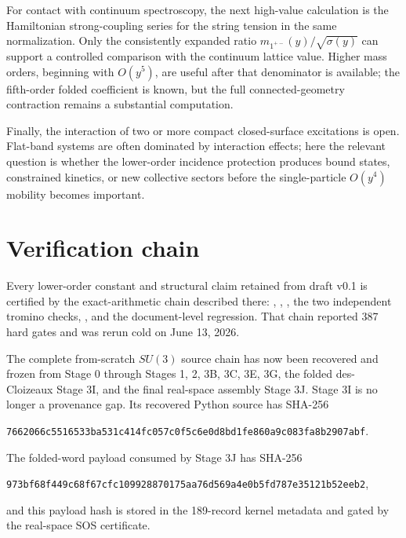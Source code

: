 \documentclass[11pt]{article}
\begin{document}
For contact with continuum spectroscopy, the next high-value calculation is
the Hamiltonian strong-coupling series for the string tension in the same
normalization. Only the consistently expanded ratio
$m_{1^{+-}}(y)/\sqrt{\sigma(y)}$ can support a controlled comparison with
the continuum lattice value. Higher mass orders, beginning with $O(y^5)$,
are useful after that denominator is available; the fifth-order folded
coefficient is known, but the full connected-geometry contraction remains a
substantial computation.

Finally, the interaction of two or more compact closed-surface excitations is
open. Flat-band systems are often dominated by interaction effects; here the
relevant question is whether the lower-order incidence protection produces
bound states, constrained kinetics, or new collective sectors before the
single-particle $O(y^4)$ mobility becomes important.

\appendix
\section{Verification chain}
\label{app:verification}

Every lower-order constant and structural claim retained from draft v0.1 is
certified by the exact-arithmetic chain described there:
, ,
, the two independent tromino checks,
, and the
document-level regression. That chain reported 387 hard gates and was rerun
cold on June 13, 2026.

The complete from-scratch $SU(3)$ source chain has now been recovered and
frozen from Stage 0 through Stages 1, 2, 3B, 3C, 3E, 3G, the folded
des-Cloizeaux Stage 3I, and the final real-space assembly Stage 3J. Stage 3I
is no longer a provenance gap. Its recovered Python source has SHA-256
\begin{center}
\texttt{7662066c5516533ba531c414fc057c0f5c6e0d8bd1fe860a9c083fa8b2907abf}.
\end{center}
The folded-word payload consumed by Stage 3J has SHA-256
\begin{center}
\texttt{973bf68f449c68f67cfc109928870175aa76d569a4e0b5fd787e35121b52eeb2},
\end{center}
and this payload hash is stored in the 189-record kernel metadata and gated by
the real-space SOS certificate.
\end{document}

